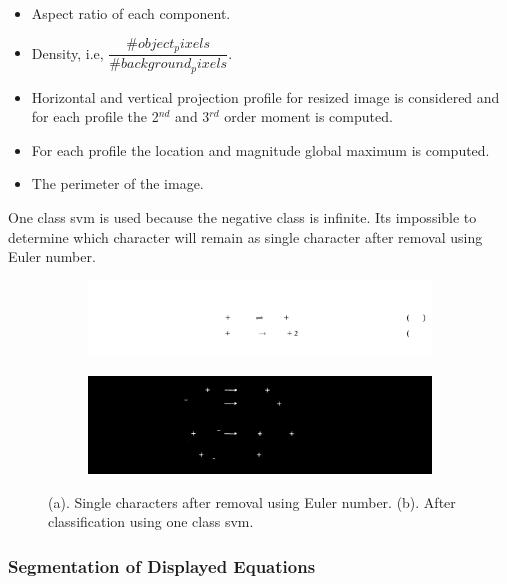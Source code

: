 \documentclass[conference]{IEEEtran}
\begin{document}
\begin{itemize}
\item
Aspect ratio of each component.
\item
Density, i.e, $\dfrac{\#object_pixels}{\#background_pixels}$. 
\item
Horizontal and vertical projection profile for resized image is considered and for each profile the 2$^{nd}$ and 3$^{rd}$ order moment is computed.
\item
For each profile the location and magnitude global maximum is computed.
\item
The perimeter of the image.   
\end{itemize}
One class svm is used because the negative class is infinite. Its impossible to determine which character will remain as single character after removal using Euler number. 

\begin{figure}[h]

\begin{subfigure}{0.5\textwidth}
\centering 
\includegraphics[width=0.9\linewidth]{singlechar} 
\caption{}
\label{fig:singlechar}
\end{subfigure}

\begin{subfigure}{0.5\textwidth}
\centering 
\includegraphics[width=0.9\linewidth]{operator}
\caption{}
\label{fig:operator}
\end{subfigure}
 
\caption{(a). Single characters after removal using Euler number. (b). After classification using one class svm.}
\label{fig:image3}

\end{figure}

\subsubsection{Segmentation of Displayed Equations}
\end{document}
